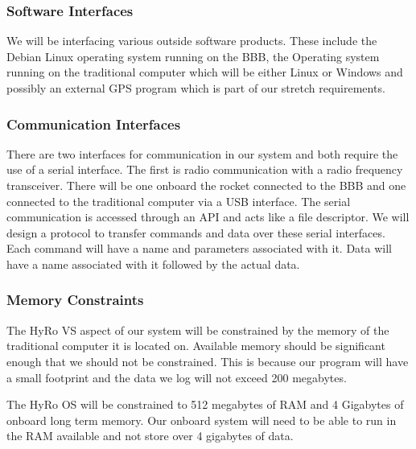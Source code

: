 \documentclass[10pt,draftclsnofoot,onecolumn,compsoc]{IEEEtran}
\begin{document}
\subsubsection{Software Interfaces}
	We will be interfacing various outside software products. These include the Debian Linux operating system running on the BBB, the Operating system running on the traditional computer which will be either Linux or Windows and possibly an external GPS program which is part of our stretch requirements.

\subsubsection{Communication Interfaces}
There are two interfaces for communication in our system and both require the use of a serial interface. The first is radio communication with a radio frequency transceiver. There will be one onboard the rocket connected to the BBB and one connected to the traditional computer via a USB interface. The serial communication is accessed through an API and acts like a file descriptor. We will design a protocol to transfer commands and data over these serial interfaces. Each command will have a name and parameters associated with it. Data will have a name associated with it followed by the actual data.
\subsubsection{Memory Constraints}
The HyRo VS aspect of our system will be constrained by the memory of the traditional computer it is located on. Available memory should be significant enough that we should not be constrained. This is because our program will have a small footprint and the data we log will not exceed 200 megabytes.\par 
	The HyRo OS will be constrained to 512 megabytes of RAM and 4 Gigabytes of onboard long term memory. Our onboard system will need to be able to run in the RAM available and not store over 4 gigabytes of data.
\end{document}
